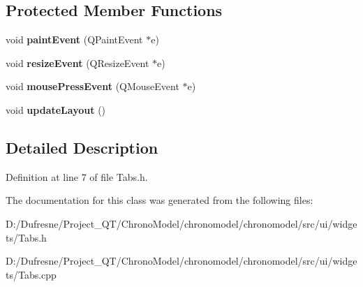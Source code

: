 \subsection*{Protected Member Functions}
\begin{DoxyCompactItemize}
\item 
\hypertarget{class_tabs_a7b0fc1283a18af4aa1afc7b5784d7c01}{void {\bfseries paint\-Event} (Q\-Paint\-Event $\ast$e)}\label{class_tabs_a7b0fc1283a18af4aa1afc7b5784d7c01}

\item 
\hypertarget{class_tabs_a5ca3f66cc27ab4b2dc61f2fe95d27976}{void {\bfseries resize\-Event} (Q\-Resize\-Event $\ast$e)}\label{class_tabs_a5ca3f66cc27ab4b2dc61f2fe95d27976}

\item 
\hypertarget{class_tabs_a3bdfcc4ec84296f21a54ba851185dbb3}{void {\bfseries mouse\-Press\-Event} (Q\-Mouse\-Event $\ast$e)}\label{class_tabs_a3bdfcc4ec84296f21a54ba851185dbb3}

\item 
\hypertarget{class_tabs_a0fd49d8dc17c9b4eeccf650cdfa0688d}{void {\bfseries update\-Layout} ()}\label{class_tabs_a0fd49d8dc17c9b4eeccf650cdfa0688d}

\end{DoxyCompactItemize}


\subsection{Detailed Description}


Definition at line 7 of file Tabs.\-h.



The documentation for this class was generated from the following files\-:\begin{DoxyCompactItemize}
\item 
D\-:/\-Dufresne/\-Project\-\_\-\-Q\-T/\-Chrono\-Model/chronomodel/chronomodel/src/ui/widgets/Tabs.\-h\item 
D\-:/\-Dufresne/\-Project\-\_\-\-Q\-T/\-Chrono\-Model/chronomodel/chronomodel/src/ui/widgets/Tabs.\-cpp\end{DoxyCompactItemize}

